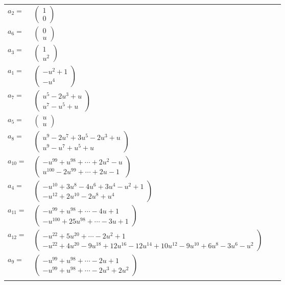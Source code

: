\documentclass[1p]{elsarticle_modified}
\theoremstyle{definition}
\begin{document}
\begin{tabular}{m{7pt} m{180pt} m{7pt} m{180pt} }
\flushright $a_{2}=$&$\begin{pmatrix}1\\0\end{pmatrix}$ \\
\flushright $a_{6}=$&$\begin{pmatrix}0\\u\end{pmatrix}$ \\
\flushright $a_{3}=$&$\begin{pmatrix}1\\u^2\end{pmatrix}$ \\
\flushright $a_{1}=$&$\begin{pmatrix}- u^2+1\\- u^4\end{pmatrix}$ \\
\flushright $a_{7}=$&$\begin{pmatrix}u^5-2 u^3+u\\u^7- u^5+u\end{pmatrix}$ \\
\flushright $a_{5}=$&$\begin{pmatrix}u\\u\end{pmatrix}$ \\
\flushright $a_{8}=$&$\begin{pmatrix}u^9-2 u^7+3 u^5-2 u^3+u\\u^9- u^7+u^5+u\end{pmatrix}$ \\
\flushright $a_{10}=$&$\begin{pmatrix}- u^{99}+u^{98}+\cdots+2 u^2- u\\u^{100}-2 u^{99}+\cdots+2 u-1\end{pmatrix}$ \\
\flushright $a_{4}=$&$\begin{pmatrix}- u^{10}+3 u^8-4 u^6+3 u^4- u^2+1\\- u^{12}+2 u^{10}-2 u^8+u^4\end{pmatrix}$ \\
\flushright $a_{11}=$&$\begin{pmatrix}- u^{99}+u^{98}+\cdots-4 u+1\\- u^{100}+25 u^{98}+\cdots-3 u+1\end{pmatrix}$ \\
\flushright $a_{12}=$&$\begin{pmatrix}- u^{22}+5 u^{20}+\cdots-2 u^2+1\\- u^{22}+4 u^{20}-9 u^{18}+12 u^{16}-12 u^{14}+10 u^{12}-9 u^{10}+6 u^8-3 u^6- u^2\end{pmatrix}$ \\
\flushright $a_{9}=$&$\begin{pmatrix}- u^{99}+u^{98}+\cdots-2 u+1\\- u^{99}+u^{98}+\cdots-2 u^3+2 u^2\end{pmatrix}$\\&\end{tabular}
\end{document}
